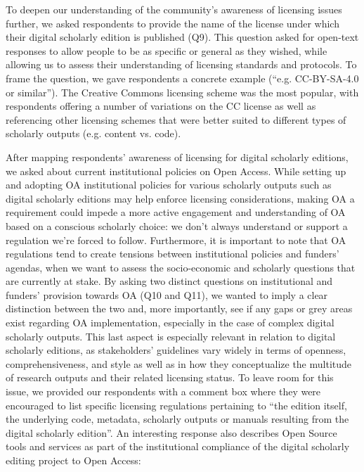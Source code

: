 \begin{paper}
To deepen our understanding of the community's awareness of licensing
issues further, we asked respondents to provide the name of the license
under which their digital scholarly edition is published (Q9). This
question asked for open-text responses to allow people to be as specific
or general as they wished, while allowing us to assess their
understanding of licensing standards and protocols. To frame the
question, we gave respondents a concrete example (``e.g. CC-BY-SA-4.0 or
similar''). The Creative Commons licensing scheme was the most popular,
with respondents offering a number of variations on the CC license as
well as referencing other licensing schemes that were better suited to
different types of scholarly outputs (e.g. content vs. code).

After mapping respondents' awareness of licensing for digital scholarly
editions, we asked about current institutional policies on Open Access.
While setting up and adopting OA institutional policies for various
scholarly outputs such as digital scholarly editions may help enforce
licensing considerations, making OA a requirement could impede a more
active engagement and understanding of OA based on a conscious scholarly
choice: we don't always understand or support a regulation we're forced
to follow. Furthermore, it is important to note that OA regulations tend
to create tensions between institutional policies and funders' agendas,
when we want to assess the socio-economic and scholarly questions that
are currently at stake. By asking two distinct questions on
institutional and funders' provision towards OA (Q10 and Q11), we wanted
to imply a clear distinction between the two and, more importantly, see
if any gaps or grey areas exist regarding OA implementation, especially
in the case of complex digital scholarly outputs. This last aspect is
especially relevant in relation to digital scholarly editions, as
stakeholders' guidelines vary widely in terms of openness,
comprehensiveness, and style as well as in how they conceptualize the
multitude of research outputs and their related licensing status. To
leave room for this issue, we provided our respondents with a comment
box where they were encouraged to list specific licensing regulations
pertaining to ``the edition itself, the underlying code, metadata,
scholarly outputs or manuals resulting from the digital scholarly
edition''. An interesting response also describes Open Source tools and
services as part of the institutional compliance of the digital
scholarly editing project to Open Access:


\end{paper}
